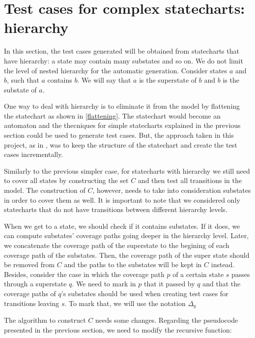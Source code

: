 \section{Test cases for complex statecharts: hierarchy}
\label{testHierarchy}

In this section, the test cases generated will be obtained from statecharts that have hierarchy: a state may contain many substates and so on. We do not limit the level of nested hierarchy for the automatic generation. Consider states $a$ and $b$, such that $a$ contains $b$. We will say that $a$ is the superstate of $b$ and $b$ is the substate of $a$.

One way to deal with hierarchy is to eliminate it from the model by flattening the statechart as shown in \ref{flattening}. The statechart would become an automaton and the thecniques for simple statecharts explained in the previous section could be used to generate test cases. But, the approach taken in this project, as in \cite{bogdanov}, was to keep the structure of the statechart and create the test cases incrementally.

Similarly to the previous simpler case, for statecharts with hierarchy we still need to cover all states by constructing the set $C$ and then test all transitions in the model. The construction of $C$, however, needs to take into consideration substates in order to cover them as well. It is important to note that we considered only statecharts that do not have transitions between different hierarchy levels. 

When we get to a state, we should check if it contains substates. If it does, we can compute substates' coverage paths going deeper in the hierarchy level. Later, we concatenate the coverage path of the superstate to the begining of each coverage path of the substates. Then, the coverage path of the super state should be removed from $C$ and the paths to the substates will be kept in $C$ instead. Besides, consider the case in which the coverage path $p$ of a certain state $s$ passes through a superstate $q$. We need to mark in $p$ that it passed by $q$ and that the coverage paths of $q$'s substates should be used when creating test cases for transitions leaving $s$. To mark that, we will use the notation $\Delta_q$

The algorithm to construct $C$ needs some changes. Regarding the pseudocode presented in the previous section, we need to modify the recursive function:

